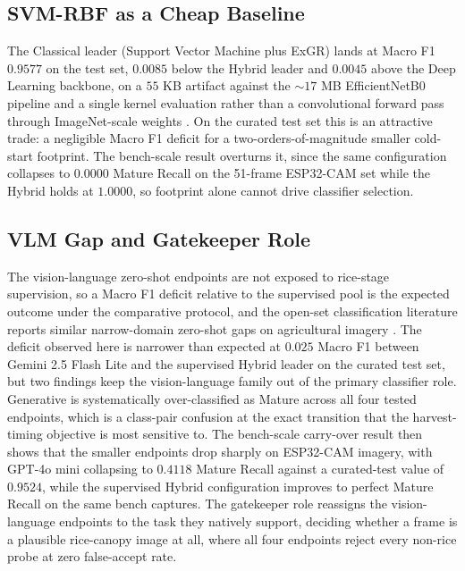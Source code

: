 \subsection{SVM-RBF as a Cheap Baseline}

The Classical leader (Support Vector Machine plus ExGR) lands at Macro F1 $0.9577$ on the test set, $0.0085$ below the Hybrid leader and $0.0045$ above the Deep Learning backbone, on a $55$ KB artifact against the $\sim$$17$ MB EfficientNetB0 pipeline and a single kernel evaluation rather than a convolutional forward pass through ImageNet-scale weights \cite{tanle2019efficientnet,sandler2018mobilenetv2}. On the curated test set this is an attractive trade: a negligible Macro F1 deficit for a two-orders-of-magnitude smaller cold-start footprint. The bench-scale result overturns it, since the same configuration collapses to $0.0000$ Mature Recall on the 51-frame ESP32-CAM set while the Hybrid holds at $1.0000$, so footprint alone cannot drive classifier selection.

\subsection{VLM Gap and Gatekeeper Role}

The vision-language zero-shot endpoints are not exposed to rice-stage supervision, so a Macro F1 deficit relative to the supervised pool is the expected outcome under the comparative protocol, and the open-set classification literature reports similar narrow-domain zero-shot gaps on agricultural imagery \cite{geng2021openset,zhang2024vlmsurvey,frontiers2026weedvlm}. The deficit observed here is narrower than expected at $0.025$ Macro F1 between Gemini 2.5 Flash Lite and the supervised Hybrid leader on the curated test set, but two findings keep the vision-language family out of the primary classifier role. Generative is systematically over-classified as Mature across all four tested endpoints, which is a class-pair confusion at the exact transition that the harvest-timing objective is most sensitive to. The bench-scale carry-over result then shows that the smaller endpoints drop sharply on ESP32-CAM imagery, with GPT-4o mini collapsing to $0.4118$ Mature Recall against a curated-test value of $0.9524$, while the supervised Hybrid configuration improves to perfect Mature Recall on the same bench captures. The gatekeeper role reassigns the vision-language endpoints to the task they natively support, deciding whether a frame is a plausible rice-canopy image at all, where all four endpoints reject every non-rice probe at zero false-accept rate.

